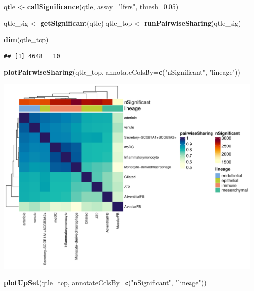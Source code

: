 \documentclass[
]{article}
\newenvironment{Shaded}{\begin{snugshade}}{\end{snugshade}}
\newcommand{\AttributeTok}[1]{\textcolor[rgb]{0.13,0.29,0.53}{#1}}
\newcommand{\FloatTok}[1]{\textcolor[rgb]{0.00,0.00,0.81}{#1}}
\newcommand{\FunctionTok}[1]{\textcolor[rgb]{0.13,0.29,0.53}{\textbf{#1}}}
\newcommand{\NormalTok}[1]{#1}
\newcommand{\OtherTok}[1]{\textcolor[rgb]{0.56,0.35,0.01}{#1}}
\newcommand{\StringTok}[1]{\textcolor[rgb]{0.31,0.60,0.02}{#1}}
\begin{document}
\footnotesize

\begin{Shaded}
\begin{Highlighting}[]
\NormalTok{qtle }\OtherTok{\textless{}{-}} \FunctionTok{callSignificance}\NormalTok{(qtle, }\AttributeTok{assay=}\StringTok{"lfsrs"}\NormalTok{, }\AttributeTok{thresh=}\FloatTok{0.05}\NormalTok{)}

\NormalTok{qtle\_sig }\OtherTok{\textless{}{-}} \FunctionTok{getSignificant}\NormalTok{(qtle)}
\NormalTok{qtle\_top }\OtherTok{\textless{}{-}} \FunctionTok{runPairwiseSharing}\NormalTok{(qtle\_sig)}

\FunctionTok{dim}\NormalTok{(qtle\_top)}
\end{Highlighting}
\end{Shaded}

\begin{verbatim}
## [1] 4648   10
\end{verbatim}

\begin{Shaded}
\begin{Highlighting}[]
\FunctionTok{plotPairwiseSharing}\NormalTok{(qtle\_top, }\AttributeTok{annotateColsBy=}\FunctionTok{c}\NormalTok{(}\StringTok{"nSignificant"}\NormalTok{, }\StringTok{"lineage"}\NormalTok{))}
\end{Highlighting}
\end{Shaded}

\includegraphics{Chapter_5_Analysis_files/figure-latex/plot-pairwise-lung-1.pdf}
\normalsize \footnotesize

\begin{Shaded}
\begin{Highlighting}[]
\FunctionTok{plotUpSet}\NormalTok{(qtle\_top, }\AttributeTok{annotateColsBy=}\FunctionTok{c}\NormalTok{(}\StringTok{"nSignificant"}\NormalTok{, }\StringTok{"lineage"}\NormalTok{))}
\end{Highlighting}
\end{Shaded}
\end{document}
